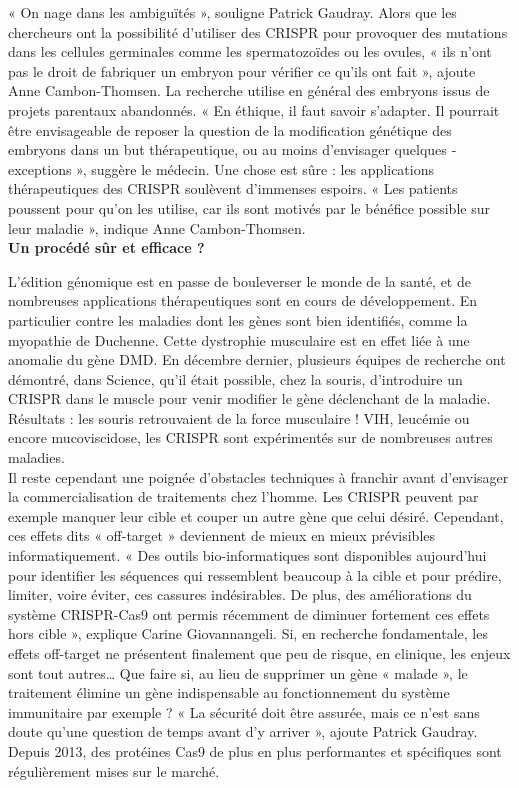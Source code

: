 \documentclass[8pt]{article}
\begin{document}
« On nage dans les ambiguïtés », souligne Patrick Gaudray. Alors que les chercheurs ont la possibilité d’uti­liser des CRISPR pour provoquer des mutations dans les cellules germinales comme les spermatozoïdes ou les ovules, « ils n’ont pas le droit de fabriquer un embryon pour vérifier ce qu’ils ont fait », ajoute Anne Cambon-Thomsen. La recherche utilise en général des embryons issus de projets parentaux abandonnés. « En éthique, il faut savoir s’adapter. Il pourrait être envisageable de reposer la question de la modification génétique des embryons dans un but thérapeutique, ou au moins d’envisager quelques ­exceptions », suggère le médecin. Une chose est sûre : les applications thérapeutiques des CRISPR soulèvent d’immenses espoirs. « Les patients poussent pour qu’on les utilise, car ils sont motivés par le bénéfice possible sur leur maladie », indique Anne Cambon-Thomsen. \\

\textbf{Un procédé sûr et efficace ?}

L’édition génomique est en passe de bouleverser le monde de la santé, et de nombreuses applications thérapeutiques sont en cours de développement. En particulier contre les maladies dont les gènes sont bien identifiés, comme la myopathie de Duchenne. Cette dystrophie musculaire est en effet liée à une anomalie du gène DMD. En décembre dernier, plusieurs équipes de recherche ont démontré, dans Science, qu’il était possible, chez la souris, d’introduire un CRISPR dans le muscle pour venir modifier le gène déclenchant de la maladie. Résultats : les souris retrouvaient de la force musculaire ! VIH, leucémie ou encore mucoviscidose, les CRISPR sont expérimentés sur de nombreuses autres maladies. \\

Il reste cependant une poignée d’obstacles techniques à franchir avant d’envisager la commercialisation de traitements chez l’homme. Les CRISPR peuvent par exemple manquer leur cible et couper un autre gène que celui désiré. Cependant, ces effets dits « off-target » ­deviennent de mieux en mieux prévisibles informatiquement. « Des outils bio-informatiques sont disponibles aujourd’hui pour identifier les séquences qui ressemblent beaucoup à la cible et pour prédire, limiter, voire éviter, ces cassures indésirables. De plus, des améliorations du système CRISPR-Cas9 ont permis récemment de diminuer fortement ces effets hors cible », explique Carine Giovannangeli. Si, en recherche fondamentale, les effets off-target ne présentent finalement que peu de risque, en clinique, les enjeux sont tout autres… Que faire si, au lieu de supprimer un gène « malade », le traitement élimine un gène indispensable au fonctionnement du système immunitaire par exemple ? « La sécurité doit être assurée, mais ce n’est sans doute qu’une question de temps avant d’y arriver », ajoute Patrick Gaudray. Depuis 2013, des protéines Cas9 de plus en plus performantes et spécifiques sont régulièrement mises sur le marché. \\
\end{document}

